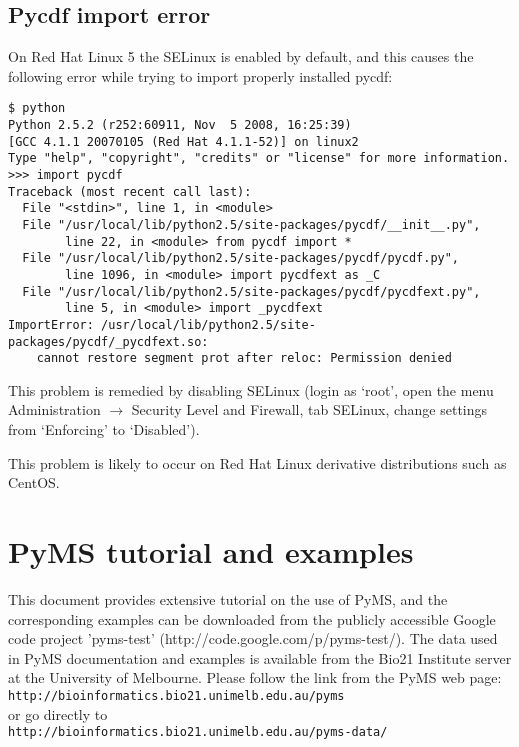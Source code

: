 \subsection{Pycdf import error}

On Red Hat Linux 5 the SELinux is enabled by default, and this causes the
following error while trying to import properly installed pycdf:

\begin{verbatim}
$ python
Python 2.5.2 (r252:60911, Nov  5 2008, 16:25:39)
[GCC 4.1.1 20070105 (Red Hat 4.1.1-52)] on linux2
Type "help", "copyright", "credits" or "license" for more information.
>>> import pycdf
Traceback (most recent call last):
  File "<stdin>", line 1, in <module>
  File "/usr/local/lib/python2.5/site-packages/pycdf/__init__.py",
        line 22, in <module> from pycdf import *
  File "/usr/local/lib/python2.5/site-packages/pycdf/pycdf.py",
        line 1096, in <module> import pycdfext as _C
  File "/usr/local/lib/python2.5/site-packages/pycdf/pycdfext.py",
        line 5, in <module> import _pycdfext
ImportError: /usr/local/lib/python2.5/site-packages/pycdf/_pycdfext.so:
    cannot restore segment prot after reloc: Permission denied
\end{verbatim}

This problem is remedied by disabling SELinux (login as `root', open the
menu Administration $\rightarrow$ Security Level and Firewall, tab SELinux,
change settings from `Enforcing' to `Disabled').

This problem is likely to occur on Red Hat Linux derivative distributions
such as CentOS.

\section{PyMS tutorial and examples}

This document provides extensive tutorial on the use of PyMS, and the
corresponding examples can be downloaded from the publicly accessible
Google code project 'pyms-test' (http://code.google.com/p/pyms-test/). 
The data used in PyMS documentation and examples is available from the
Bio21 Institute server at the University of Melbourne. Please follow
the link from the PyMS web page:\\
{\tt http://bioinformatics.bio21.unimelb.edu.au/pyms}\\
or go directly to\\
{\tt http://bioinformatics.bio21.unimelb.edu.au/pyms-data/}\\

